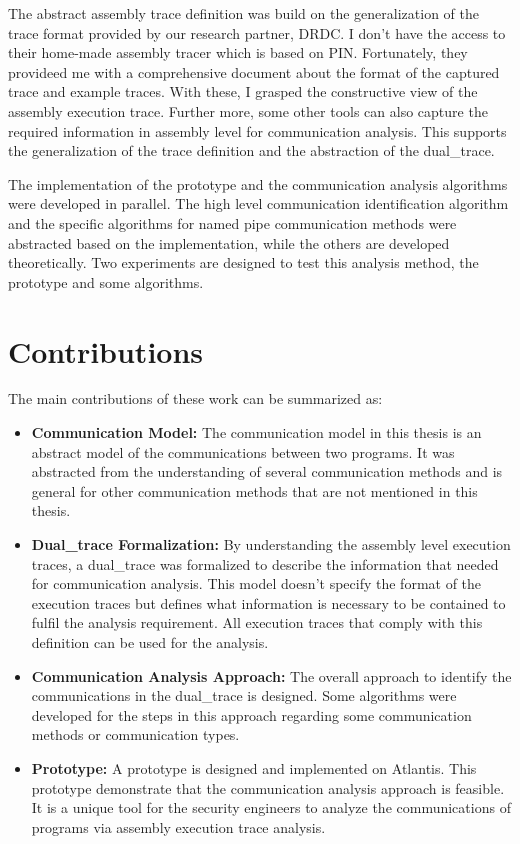 The abstract assembly trace definition was build on the generalization of the trace format provided by our research partner, DRDC. I don't have the access to their home-made assembly tracer which is based on PIN\cite{_pin_????}. Fortunately, they provideed me with a comprehensive document about the format of the captured trace and example traces. With these, I grasped the constructive view of the assembly execution trace. Further more, some other tools can also capture the required information in assembly level for communication analysis. This supports the generalization of the trace definition and the abstraction of the dual\_trace.

The implementation of the prototype and the communication analysis algorithms were developed in parallel. The high level communication identification algorithm and the specific algorithms for named pipe communication methods were abstracted based on the implementation, while the others are developed theoretically. Two experiments are designed to test this analysis method, the prototype and some algorithms. 


\section{Contributions}
The main contributions of these work can be summarized as:
\begin{itemize}
  \item \textbf{Communication Model:} The communication model in this thesis is an abstract model of the communications between two programs. It was abstracted from the understanding of several communication methods and is general for other communication methods that are not mentioned in this thesis.
  \item \textbf{Dual\_trace Formalization:} By understanding the assembly level execution traces, a dual\_trace was formalized to describe the information that needed for communication analysis. This model doesn't specify the format of the execution traces but defines what information is necessary to be contained to fulfil the analysis requirement. All execution traces that comply with this definition can be used for the analysis.
  \item \textbf{Communication Analysis Approach:} The overall approach to identify the communications in the dual\_trace is designed. Some algorithms were developed for the steps in this
approach regarding some communication methods or communication types.
  \item \textbf{Prototype:} A prototype is designed and implemented on Atlantis. This prototype demonstrate that the communication analysis approach is feasible. It is a unique tool for the security engineers to analyze the communications of programs via assembly execution trace analysis.
\end{itemize}

